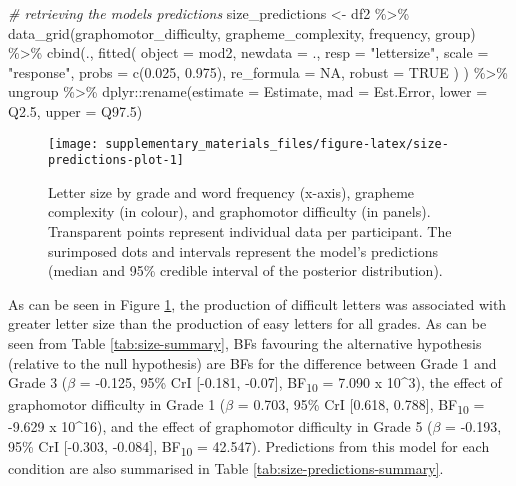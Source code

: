 \documentclass[
  11pt,
  english,
  ,doc,floatsintext]{apa6}
\newenvironment{Shaded}{}{}
\newcommand{\AttributeTok}[1]{\textcolor[rgb]{0.49,0.56,0.16}{#1}}
\newcommand{\CommentTok}[1]{\textcolor[rgb]{0.38,0.63,0.69}{\textit{#1}}}
\newcommand{\ConstantTok}[1]{\textcolor[rgb]{0.53,0.00,0.00}{#1}}
\newcommand{\FloatTok}[1]{\textcolor[rgb]{0.25,0.63,0.44}{#1}}
\newcommand{\FunctionTok}[1]{\textcolor[rgb]{0.02,0.16,0.49}{#1}}
\newcommand{\NormalTok}[1]{#1}
\newcommand{\OtherTok}[1]{\textcolor[rgb]{0.00,0.44,0.13}{#1}}
\newcommand{\SpecialCharTok}[1]{\textcolor[rgb]{0.25,0.44,0.63}{#1}}
\newcommand{\StringTok}[1]{\textcolor[rgb]{0.25,0.44,0.63}{#1}}
\begin{document}
\begin{Shaded}
\begin{Highlighting}[]
\CommentTok{\# retrieving the model\textquotesingle{}s predictions}
\NormalTok{size\_predictions }\OtherTok{\textless{}{-}}\NormalTok{ df2 }\SpecialCharTok{\%\textgreater{}\%}
    \FunctionTok{data\_grid}\NormalTok{(graphomotor\_difficulty, grapheme\_complexity, frequency, group) }\SpecialCharTok{\%\textgreater{}\%}
    \FunctionTok{cbind}\NormalTok{(., }\FunctionTok{fitted}\NormalTok{(}
        \AttributeTok{object =}\NormalTok{ mod2, }\AttributeTok{newdata =}\NormalTok{ ., }\AttributeTok{resp =} \StringTok{"lettersize"}\NormalTok{,}
        \AttributeTok{scale =} \StringTok{"response"}\NormalTok{, }\AttributeTok{probs =} \FunctionTok{c}\NormalTok{(}\FloatTok{0.025}\NormalTok{, }\FloatTok{0.975}\NormalTok{),}
        \AttributeTok{re\_formula =} \ConstantTok{NA}\NormalTok{, }\AttributeTok{robust =} \ConstantTok{TRUE}
\NormalTok{        ) ) }\SpecialCharTok{\%\textgreater{}\%}
\NormalTok{    ungroup }\SpecialCharTok{\%\textgreater{}\%}
\NormalTok{    dplyr}\SpecialCharTok{::}\FunctionTok{rename}\NormalTok{(}\AttributeTok{estimate =}\NormalTok{ Estimate, }\AttributeTok{mad =}\NormalTok{ Est.Error, }\AttributeTok{lower =}\NormalTok{ Q2}\FloatTok{.5}\NormalTok{, }\AttributeTok{upper =}\NormalTok{ Q97}\FloatTok{.5}\NormalTok{)}
\end{Highlighting}
\end{Shaded}

\begin{figure}[!htb]

{\centering \texttt{[image: supplementary\_materials\_files/figure-latex/size-predictions-plot-1]} 

}

\caption{Letter size by grade and word frequency (x-axis), grapheme complexity (in colour), and graphomotor difficulty (in panels). Transparent points represent individual data per participant. The surimposed dots and intervals represent the model's predictions (median and 95\% credible interval of the posterior distribution).}\label{fig:size-predictions-plot}
\end{figure}

As can be seen in Figure \ref{fig:size-predictions-plot}, the production of difficult letters was associated with greater letter size than the production of easy letters for all grades. As can be seen from Table \ref{tab:size-summary}, BFs favouring the alternative hypothesis (relative to the null hypothesis) are BFs for the difference between Grade 1 and Grade 3 (\(\beta\) = -0.125, 95\% CrI {[}-0.181, -0.07{]}, BF\textsubscript{10} = 7.090 x 10\^{}3), the effect of graphomotor difficulty in Grade 1 (\(\beta\) = 0.703, 95\% CrI {[}0.618, 0.788{]}, BF\textsubscript{10} = -9.629 x 10\^{}16), and the effect of graphomotor difficulty in Grade 5 (\(\beta\) = -0.193, 95\% CrI {[}-0.303, -0.084{]}, BF\textsubscript{10} = 42.547). Predictions from this model for each condition are also summarised in Table \ref{tab:size-predictions-summary}.
\end{document}
